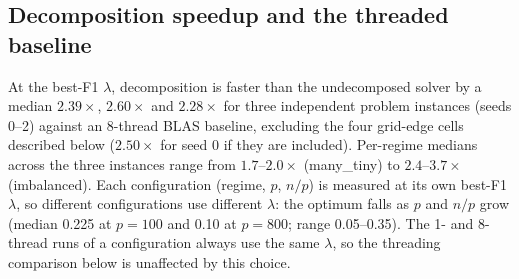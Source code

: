 \documentclass[pdflatex,sn-mathphys-num]{sn-jnl}
\begin{document}
\subsection{Decomposition speedup and the threaded baseline}
\label{sec:speedup}
At the best-F1 $\lambda$, decomposition is faster than the undecomposed
solver by a median $2.39\times$, $2.60\times$ and $2.28\times$ for three
independent problem instances (seeds 0--2) against an 8-thread BLAS
baseline, excluding the four grid-edge cells described below ($2.50\times$
for seed 0 if they are included). Per-regime medians across the three instances range from
$1.7$--$2.0\times$ (many\_tiny) to $2.4$--$3.7\times$ (imbalanced). Each configuration (regime, $p$, $n/p$) is measured at its own best-F1
$\lambda$, so different configurations use different $\lambda$: the optimum
falls as $p$ and $n/p$ grow (median 0.225 at $p=100$ and 0.10 at $p=800$;
range 0.05--0.35). The 1- and 8-thread runs of a configuration always use
the same $\lambda$, so the threading comparison below is unaffected by this choice.
\end{document}
